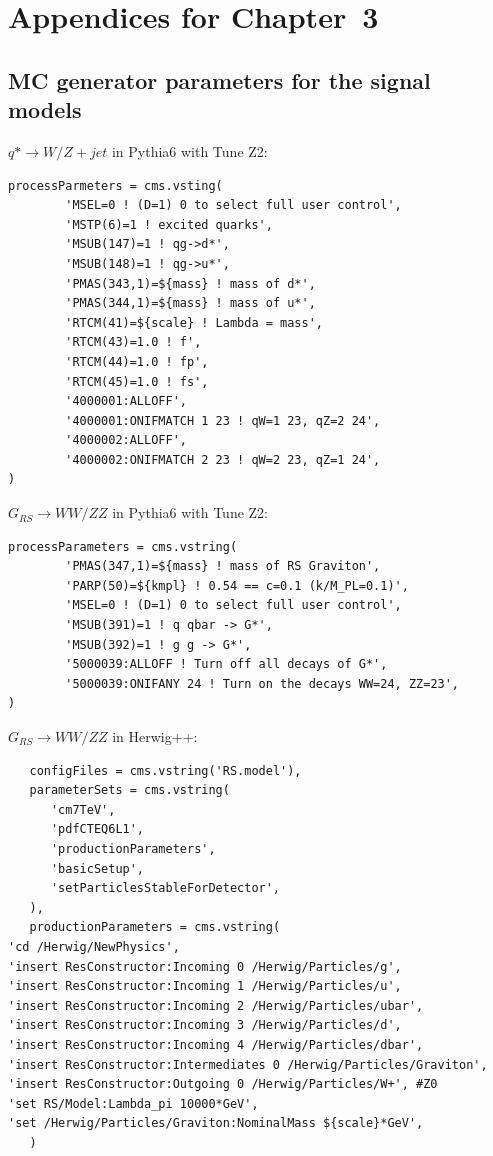 \chapter{Appendices for Chapter~3}

\section{MC generator parameters for the signal models}
\label{appendix:parameters1}
$q* \to W/Z + jet$ in Pythia6 with Tune Z2:
\begin{verbatim}
processParmeters = cms.vsting(
        'MSEL=0 ! (D=1) 0 to select full user control',
        'MSTP(6)=1 ! excited quarks',
        'MSUB(147)=1 ! qg->d*',
        'MSUB(148)=1 ! qg->u*',
        'PMAS(343,1)=${mass} ! mass of d*',
        'PMAS(344,1)=${mass} ! mass of u*',
        'RTCM(41)=${scale} ! Lambda = mass',
        'RTCM(43)=1.0 ! f',
        'RTCM(44)=1.0 ! fp',
        'RTCM(45)=1.0 ! fs',
        '4000001:ALLOFF',
        '4000001:ONIFMATCH 1 23 ! qW=1 23, qZ=2 24',
        '4000002:ALLOFF',
        '4000002:ONIFMATCH 2 23 ! qW=2 23, qZ=1 24',
)
\end{verbatim}

$G_{RS} \to WW/ZZ$ in Pythia6 with Tune Z2:
\begin{verbatim}
processParameters = cms.vstring(
        'PMAS(347,1)=${mass} ! mass of RS Graviton',
        'PARP(50)=${kmpl} ! 0.54 == c=0.1 (k/M_PL=0.1)',
        'MSEL=0 ! (D=1) 0 to select full user control',
        'MSUB(391)=1 ! q qbar -> G*',
        'MSUB(392)=1 ! g g -> G*',
        '5000039:ALLOFF ! Turn off all decays of G*',
        '5000039:ONIFANY 24 ! Turn on the decays WW=24, ZZ=23',
)
\end{verbatim}

$G_{RS} \to WW/ZZ$ in Herwig++:
\begin{verbatim}
   configFiles = cms.vstring('RS.model'),
   parameterSets = cms.vstring(
      'cm7TeV',
      'pdfCTEQ6L1',
      'productionParameters',
      'basicSetup',
      'setParticlesStableForDetector',
   ),
   productionParameters = cms.vstring(
'cd /Herwig/NewPhysics',
'insert ResConstructor:Incoming 0 /Herwig/Particles/g',
'insert ResConstructor:Incoming 1 /Herwig/Particles/u',
'insert ResConstructor:Incoming 2 /Herwig/Particles/ubar',
'insert ResConstructor:Incoming 3 /Herwig/Particles/d',
'insert ResConstructor:Incoming 4 /Herwig/Particles/dbar',
'insert ResConstructor:Intermediates 0 /Herwig/Particles/Graviton',
'insert ResConstructor:Outgoing 0 /Herwig/Particles/W+', #Z0
'set RS/Model:Lambda_pi 10000*GeV',
'set /Herwig/Particles/Graviton:NominalMass ${scale}*GeV',
   )
\end{verbatim}

